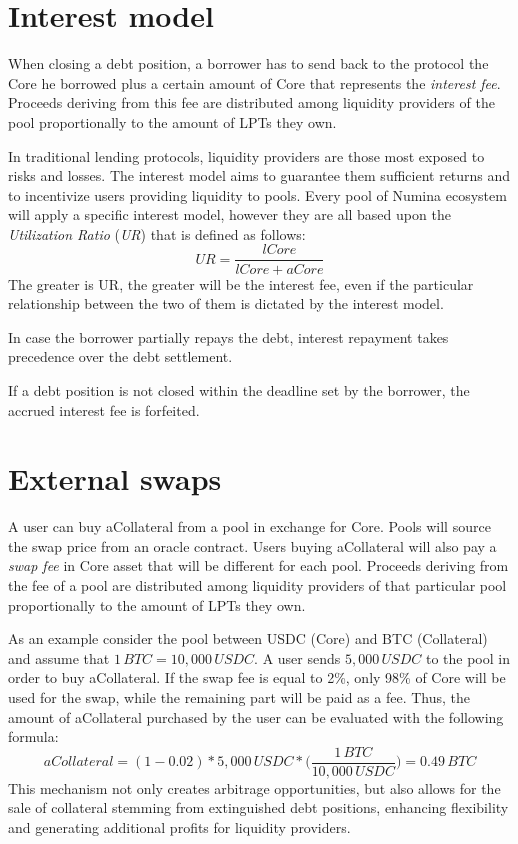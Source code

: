 \documentclass[12pt]{paper}
\begin{document}
\section{Interest model}
\label{sec:interest}
	When closing a debt position, a borrower has to send back to the protocol the Core he borrowed plus a certain amount of Core that represents the \textit{interest fee}. Proceeds deriving from this fee are distributed among liquidity providers of the pool proportionally to the amount of LPTs they own.
	\par In traditional lending protocols, liquidity providers are those most exposed to risks and losses. The interest model aims to guarantee them sufficient returns and to incentivize users providing liquidity to pools. Every pool of Numina ecosystem will apply a specific interest model, however they are all based upon the \textit{Utilization Ratio} (\textit{UR}) that is defined as follows:
	\begin{equation}
		UR = \frac{lCore}{lCore + aCore}
	\end{equation}
	The greater is UR, the greater will be the interest fee, even if the particular relationship between the two of them is dictated by the interest model.
	\par In case the borrower partially repays the debt, interest repayment takes precedence over the debt settlement.
	\par If a debt position is not closed within the deadline set by the borrower, the accrued interest fee is forfeited.

\section{External swaps}
\label{sec:extswap}
	A user can buy aCollateral from a pool in exchange for Core. Pools will source the swap price from an oracle contract. Users buying aCollateral will also pay a \textit{swap fee} in Core asset that will be different for each pool. Proceeds deriving from the fee of a pool are distributed among liquidity providers of that particular pool proportionally to the amount of LPTs they own.
	\par As an example consider the pool between USDC (Core) and BTC (Collateral) and assume that $1 \, BTC = 10,000 \, USDC$. A user sends $5,000 \, USDC$ to the pool in order to buy aCollateral. If the swap fee is equal to 2\%, only 98\% of Core will be used for the swap, while the remaining part will be paid as a fee. Thus, the amount of aCollateral purchased by the user can be evaluated with the following formula:
	\begin{equation*}
		aCollateral = (1 - 0.02) * 5,000\,USDC * \Big(\frac{1\,BTC}{10,000\,USDC} \Big) = 0.49\,BTC
	\end{equation*}
	This mechanism not only creates arbitrage opportunities, but also allows for the sale of collateral stemming from extinguished debt positions, enhancing flexibility and generating additional profits for liquidity providers.
\end{document}
